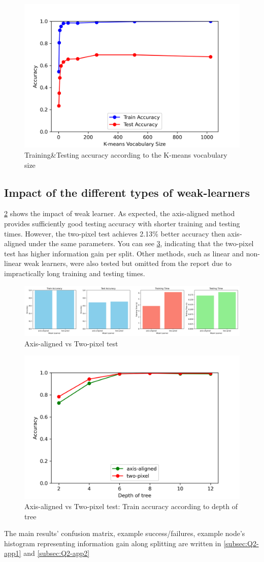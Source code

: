 \begin{figure}[htbp]
	\centering
	\includegraphics[width=0.4\linewidth]{image/q2-fig5.png}
	\caption{Training\&Testing accuracy according to the K-means vocabulary size}
	\label{fig:q2-fig5}
\end{figure}

\subsection{Impact of the different types of weak-learners}
\cref{fig:q2-fig6} shows the impact of weak learner. As expected, the axis-aligned method provides sufficiently good testing accuracy with shorter training and testing times. However, the two-pixel test achieves 2.13\% better accuracy then axis-aligned under the same parameters. You can see \cref{fig:q2-fig7}, indicating that the two-pixel test has higher information gain per split. Other methods, such as linear and non-linear weak learners, were also tested but omitted from the report due to impractically long training and testing times.

\begin{figure}
	\centering
	\includegraphics[width=0.8\linewidth]{image/q2-fig6.png}
	\caption{Axis-aligned vs Two-pixel test}
	\label{fig:q2-fig6}
\end{figure}

\begin{figure}
	\centering
	\includegraphics[width=0.4\linewidth]{image/q2-fig7-1.png}
	\caption{Axis-aligned vs Two-pixel test: Train accuracy according to depth of tree}
	\label{fig:q2-fig7}
\end{figure}

The main results' confusion matrix, example success/failures, example node's histogram representing information gain along splitting are written in \cref{subsec:Q2-app1} and \cref{subsec:Q2-app2}